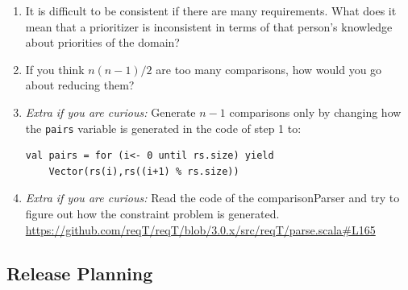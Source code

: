 \documentclass[11pt]{article}
\begin{document}
\begin{framed}
\begin{enumerate}
\vspace{4em}
\item It is difficult to be consistent if there are many requirements. What does it mean that a prioritizer is inconsistent in terms of that person's knowledge about priorities of the domain?
\vspace{4em}
\item If you think $n(n-1)/2$ are too many comparisons, how would you go about reducing them?
 \vspace{3em}
\item {\it Extra if you are curious:} Generate $n-1$ comparisons only by changing how the \verb+pairs+ variable is generated in the code of step 1 to:
\begin{lstlisting}
val pairs = for (i<- 0 until rs.size) yield 
    Vector(rs(i),rs((i+1) % rs.size)) 
\end{lstlisting}
\item {\it Extra if you are curious:} Read the code of the comparisonParser and try to figure out how the constraint problem is generated. \url{https://github.com/reqT/reqT/blob/3.0.x/src/reqT/parse.scala#L165} 
\end{enumerate}

\end{framed}

\clearpage\newpage

\subsection{Release Planning}
\end{document}
